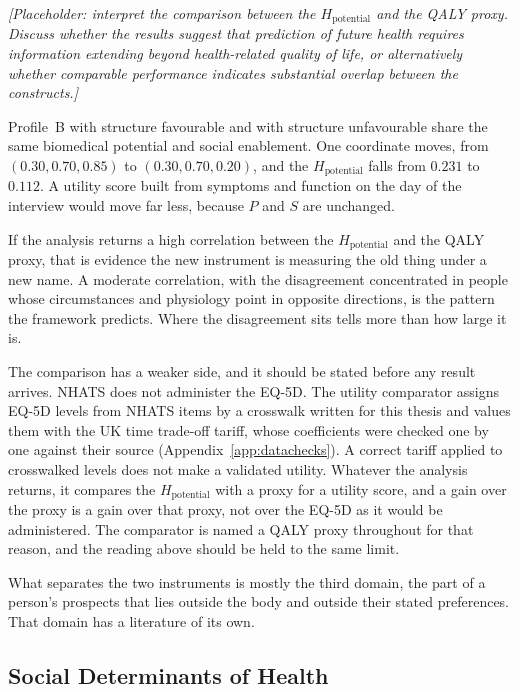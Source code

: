 \medskip
\noindent\emph{[Placeholder: interpret the comparison between the $H_{\text{potential}}$ and the QALY proxy. Discuss whether the results suggest that prediction of future health requires information extending beyond health-related quality of life, or alternatively whether comparable performance indicates substantial overlap between the constructs.]}

\begin{reading}
Profile~B with structure favourable and with structure unfavourable share the
same biomedical potential and social enablement. One coordinate moves, from
$(0.30,0.70,0.85)$ to $(0.30,0.70,0.20)$, and the $H_{\text{potential}}$ falls
from $0.231$ to $0.112$. A utility score built from symptoms and function on the
day of the interview would move far less, because $P$ and $S$ are unchanged.

If the analysis returns a high correlation between the $H_{\text{potential}}$ and
the QALY proxy, that is evidence the new instrument is measuring the old thing
under a new name. A moderate correlation, with the disagreement concentrated in
people whose circumstances and physiology point in opposite directions, is the
pattern the framework predicts. Where the disagreement sits tells more than how
large it is.
\end{reading}

The comparison has a weaker side, and it should be stated before any result
arrives. NHATS does not administer the EQ-5D. The utility comparator assigns EQ-5D
levels from NHATS items by a crosswalk written for this thesis and values them with
the UK time trade-off tariff, whose coefficients were checked one by one against
their source (Appendix~\ref{app:datachecks}). A correct tariff applied to
crosswalked levels does not make a validated utility. Whatever the analysis returns,
it compares the $H_{\text{potential}}$ with a proxy for a utility score, and a gain
over the proxy is a gain over that proxy, not over the EQ-5D as it would be
administered. The comparator is named a QALY proxy throughout for that reason, and
the reading above should be held to the same limit.

What separates the two instruments is mostly the third domain, the part of a
person's prospects that lies outside the body and outside their stated
preferences. That domain has a literature of its own.

\subsection{Social Determinants of Health}
\label{sec:disc-sdh}

